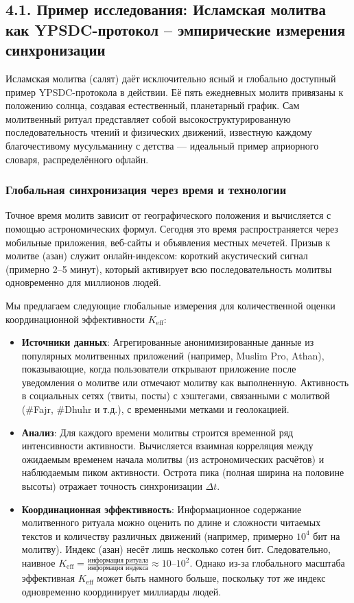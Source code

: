 \documentclass[12pt,a4paper]{article}
\newcommand{\Keff}{K_{\mathrm{eff}}}
\begin{document}
	\subsection{4.1. Пример исследования: Исламская молитва как YPSDC-протокол – эмпирические измерения синхронизации}
	\label{subsec:islamic_prayer}
	
	Исламская молитва (салят) даёт исключительно ясный и глобально доступный пример YPSDC-протокола в действии. Её пять ежедневных молитв привязаны к положению солнца, создавая естественный, планетарный график. Сам молитвенный ритуал представляет собой высокоструктурированную последовательность чтений и физических движений, известную каждому благочестивому мусульманину с детства — идеальный пример априорного словаря, распределённого офлайн.
	
	\subsubsection{Глобальная синхронизация через время и технологии}
	Точное время молитв зависит от географического положения и вычисляется с помощью астрономических формул. Сегодня это время распространяется через мобильные приложения, веб-сайты и объявления местных мечетей. Призыв к молитве (азан) служит онлайн-индексом: короткий акустический сигнал (примерно 2–5 минут), который активирует всю последовательность молитвы одновременно для миллионов людей.
	
	Мы предлагаем следующие глобальные измерения для количественной оценки координационной эффективности \(\Keff\):
	\begin{itemize}
		\item \textbf{Источники данных}: Агрегированные анонимизированные данные из популярных молитвенных приложений (например, Muslim Pro, Athan), показывающие, когда пользователи открывают приложение после уведомления о молитве или отмечают молитву как выполненную. Активность в социальных сетях (твиты, посты) с хэштегами, связанными с молитвой (\#Fajr, \#Dhuhr и т.д.), с временными метками и геолокацией.
		\item \textbf{Анализ}: Для каждого времени молитвы строится временной ряд интенсивности активности. Вычисляется взаимная корреляция между ожидаемым временем начала молитвы (из астрономических расчётов) и наблюдаемым пиком активности. Острота пика (полная ширина на половине высоты) отражает точность синхронизации \(\Delta t\).
		\item \textbf{Координационная эффективность}: Информационное содержание молитвенного ритуала можно оценить по длине и сложности читаемых текстов и количеству различных движений (например, примерно \(10^4\) бит на молитву). Индекс (азан) несёт лишь несколько сотен бит. Следовательно, наивное \(\Keff = \frac{\text{информация ритуала}}{\text{информация индекса}} \approx 10\)–\(10^2\). Однако из-за глобального масштаба эффективная \(\Keff\) может быть намного больше, поскольку тот же индекс одновременно координирует миллиарды людей.
	\end{itemize}
	
\end{document}
